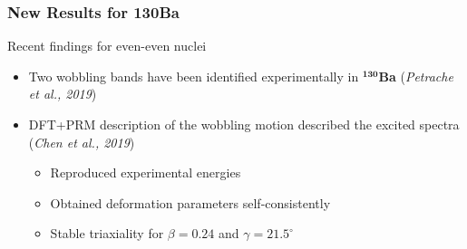 \documentclass{beamer}
\begin{document}
\begin{frame}
  \frametitle{New Results for 130Ba}
  \begin{minipage}{.8\textwidth}
    \begin{block}{Recent findings for even-even nuclei}
      \begin{itemize}
        \item Two wobbling bands have been identified experimentally in \textbf{$^\mathbf{130}$Ba} (\textit{Petrache et al., 2019})
        \item DFT+PRM description of the wobbling motion described the excited spectra (\textit{Chen et al., 2019})
        \begin{itemize}
          \item Reproduced experimental energies
          \item Obtained deformation parameters self-consistently
          \item Stable triaxiality for $\beta=0.24$ and $\gamma=21.5^\circ$
        \end{itemize}
      \end{itemize}
    \end{block}
  \end{minipage}%
  \begin{minipage}{.2\textwidth}
    \begin{figure}
      \centering

\end{figure}
\end{minipage}
\end{frame}
\end{document}
